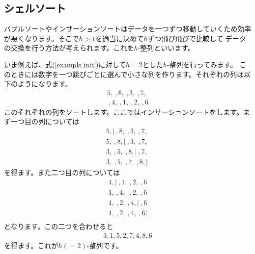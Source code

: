 \documentclass[dvipdfmx]{jarticle}
\begin{document}
\subsection{シェルソート}
バブルソートやインサーションソートはデータを一つずつ移動していくため効率が悪くなります。そこで$h>1$を適当に決めて$h$ずつ飛び飛びで比較して
データの交換を行う方法が考えられます。これを$h$-整列といいます。

いま例えば、式(\ref{example init})に対して$h=2$とした$h$-整列を行ってみます。
このときには数字を一つ跳びごとに選んで小さな列を作ります。それぞれの列は以下のようになります。
\begin{eqnarray}
5, ~,  8, ~, 3, ~, 7, ~\\
~, 4,  ~, 1, ~, 2, ~, 6
\end{eqnarray}
このそれぞれの列をソートします。ここではインサーションソートをします。まず一つ目の列については
\begin{eqnarray}
5,| ~,  8, ~, 3, ~, 7, ~\\
5, ~,  8,| ~, 3, ~, 7, ~\\
3, ~,  5, ~,  8,| ~, 7, ~\\
3, ~,  5, ~,  7, ~, 8,| ~
\end{eqnarray}
を得ます。また二つ目の列については
\begin{eqnarray}
 4,|  ~, 1, ~, 2, ~, 6\\
 1,  ~, 4,| ~, 2, ~, 6\\
 1,  ~, 2, ~, 4,| ~, 6\\
 1,  ~, 2, ~, 4, ~, 6|\\
\end{eqnarray}
となります。この二つを合わせると
\begin{eqnarray}
3, 1, 5,  2, 7, 4, 8, 6 
\end{eqnarray}
を得ます。これが$h(=2)$-整列です。
\end{document}
